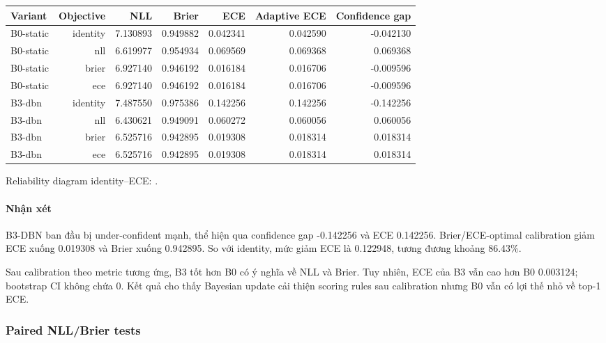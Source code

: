 \begin{table}[!htbp]
\centering
\scriptsize
\setlength{\tabcolsep}{2.5pt}
\begin{adjustbox}{max width=\textwidth}
\begin{tabular}{@{}lrrrrrr@{}}
\toprule
Variant & Objective & NLL & Brier & ECE & Adaptive ECE & Confidence gap \\
\midrule
B0-static & identity & 7.130893 & 0.949882 & 0.042341 & 0.042590 & -0.042130 \\
B0-static & nll & 6.619977 & 0.954934 & 0.069569 & 0.069368 & 0.069368 \\
B0-static & brier & 6.927140 & 0.946192 & 0.016184 & 0.016706 & -0.009596 \\
B0-static & ece & 6.927140 & 0.946192 & 0.016184 & 0.016706 & -0.009596 \\
B3-dbn & identity & 7.487550 & 0.975386 & 0.142256 & 0.142256 & -0.142256 \\
B3-dbn & nll & 6.430621 & 0.949091 & 0.060272 & 0.060056 & 0.060056 \\
B3-dbn & brier & 6.525716 & 0.942895 & 0.019308 & 0.018314 & 0.018314 \\
B3-dbn & ece & 6.525716 & 0.942895 & 0.019308 & 0.018314 & 0.018314 \\
\bottomrule
\end{tabular}
\end{adjustbox}
\end{table}

Reliability diagram identity--ECE: .

\paragraph{Nhận xét}

B3-DBN ban đầu bị under-confident mạnh, thể hiện qua confidence gap -0.142256 và ECE 0.142256. Brier/ECE-optimal calibration giảm ECE xuống 0.019308 và Brier xuống 0.942895. So với identity, mức giảm ECE là 0.122948, tương đương khoảng 86.43\%.

Sau calibration theo metric tương ứng, B3 tốt hơn B0 có ý nghĩa về NLL và Brier. Tuy nhiên, ECE của B3 vẫn cao hơn B0 0.003124; bootstrap CI không chứa 0. Kết quả cho thấy Bayesian update cải thiện scoring rules sau calibration nhưng B0 vẫn có lợi thế nhỏ về top-1 ECE.

\subsubsection*{Paired NLL/Brier tests}

